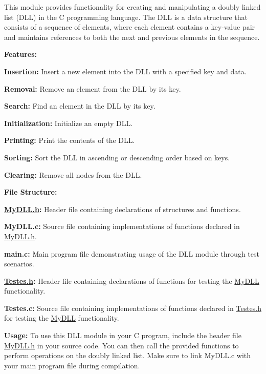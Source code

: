 This module provides functionality for creating and manipulating a doubly linked list (DLL) in the C programming language. The DLL is a data structure that consists of a sequence of elements, where each element contains a key-\/value pair and maintains references to both the next and previous elements in the sequence.

{\bfseries{Features\+:}}
\begin{DoxyItemize}
\item {\bfseries{Insertion\+:}} Insert a new element into the DLL with a specified key and data.
\item {\bfseries{Removal\+:}} Remove an element from the DLL by its key.
\item {\bfseries{Search\+:}} Find an element in the DLL by its key.
\item {\bfseries{Initialization\+:}} Initialize an empty DLL.
\item {\bfseries{Printing\+:}} Print the contents of the DLL.
\item {\bfseries{Sorting\+:}} Sort the DLL in ascending or descending order based on keys.
\item {\bfseries{Clearing\+:}} Remove all nodes from the DLL.
\end{DoxyItemize}

{\bfseries{File Structure\+:}}
\begin{DoxyItemize}
\item {\bfseries{\mbox{\hyperlink{MyDLL_8h}{My\+DLL.\+h}}\+:}} Header file containing declarations of structures and functions.
\item {\bfseries{My\+DLL.\+c\+:}} Source file containing implementations of functions declared in \mbox{\hyperlink{MyDLL_8h}{My\+DLL.\+h}}.
\item {\bfseries{main.\+c\+:}} Main program file demonstrating usage of the DLL module through test scenarios.
\item {\bfseries{\mbox{\hyperlink{Testes_8h}{Testes.\+h}}\+:}} Header file containing declarations of functions for testing the \mbox{\hyperlink{structMyDLL}{My\+DLL}} functionality.
\item {\bfseries{Testes.\+c\+:}} Source file containing implementations of functions declared in \mbox{\hyperlink{Testes_8h}{Testes.\+h}} for testing the \mbox{\hyperlink{structMyDLL}{My\+DLL}} functionality.
\end{DoxyItemize}

{\bfseries{Usage\+:}} To use this DLL module in your C program, include the header file \mbox{\hyperlink{MyDLL_8h}{My\+DLL.\+h}} in your source code. You can then call the provided functions to perform operations on the doubly linked list. Make sure to link My\+DLL.\+c with your main program file during compilation.

